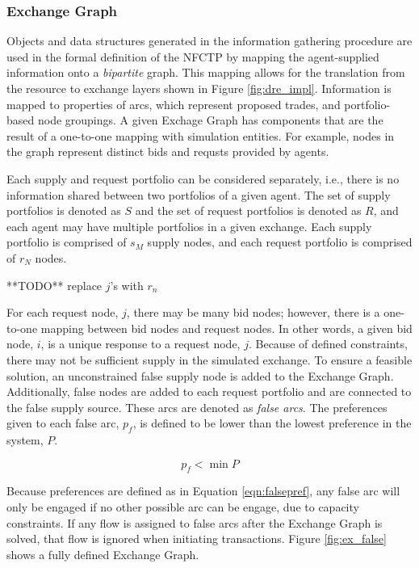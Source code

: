 \subsubsection{Exchange Graph}

Objects and data structures generated in the information gathering procedure are
used in the formal definition of the NFCTP by mapping the agent-supplied
information onto a \textit{bipartite} graph. This mapping allows for the
translation from the resource to exchange layers shown in Figure
\ref{fig:dre_impl}. Information is mapped to properties of arcs, which represent
proposed trades, and portfolio-based node groupings. A given Exchage Graph has
components that are the result of a one-to-one mapping with simulation
entities. For example, nodes in the graph represent distinct bids and requsts
provided by agents.

Each supply and request portfolio can be considered separately, i.e., there is
no information shared between two portfolios of a given agent. The set of supply
portfolios is denoted as $S$ and the set of request portfolios is denoted as
$R$, and each agent may have multiple portfolios in a given exchange. Each
supply portfolio is comprised of $s_M$ supply nodes, and each request portfolio
is comprised of $r_N$ nodes.

**TODO** replace $j$'s with $r_n$

For each request node, $j$, there may be many bid nodes; however, there is a
one-to-one mapping between bid nodes and request nodes. In other words, a given
bid node, $i$, is a unique response to a request node, $j$. Because of defined
constraints, there may not be sufficient supply in the simulated exchange. To
ensure a feasible solution, an unconstrained false supply node is added to the
Exchange Graph. Additionally, false nodes are added to each request portfolio
and are connected to the false supply source. These arcs are denoted as
\textit{false arcs}. The preferences given to each false arc, $p_f$, is defined
to be lower than the lowest preference in the system, $P$.

\begin{equation}\label{eqn:falsepref}
  p_{f} < \min P
\end{equation}

Because preferences are defined as in Equation \ref{eqn:falsepref}, any false
arc will only be engaged if no other possible arc can be engage, due to capacity
constraints. If any flow is assigned to false arcs after the Exchange Graph is
solved, that flow is ignored when initiating transactions. Figure
\ref{fig:ex_false} shows a fully defined Exchange Graph.

